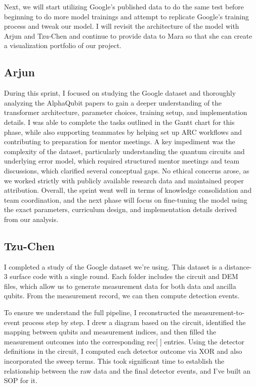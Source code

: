 \documentclass[12pt]{article}
\begin{document}
Next, we will start utilizing Google’s published data to do the same test before beginning to 
do more model trainings and attempt to replicate Google’s training process and tweak our 
model. I will revisit the architecture of the model with Arjun and Tzu-Chen and continue 
to provide data to Mara so that she can create a visualization portfolio of our project.


\subsection*{Arjun}

During this sprint, I focused on studying the Google dataset and thoroughly analyzing the AlphaQubit
 papers to gain a deeper understanding of the transformer architecture, parameter choices, training 
 setup, and implementation details. I was able to complete the tasks outlined in the Gantt chart for 
 this phase, while also supporting teammates by helping set up ARC workflows and contributing to 
 preparation for mentor meetings. A key impediment was the complexity of the dataset, particularly
  understanding the quantum circuits and underlying error model, which required structured mentor 
  meetings and team discussions, which clarified several conceptual gaps. No ethical concerns 
  arose, as we worked strictly with publicly available research data and maintained proper attribution.
   Overall, the sprint went well in terms of knowledge consolidation and team coordination, and
    the next phase will focus on fine-tuning the model using the exact parameters, curriculum design, 
    and implementation details derived from our analysis.

\subsection*{Tzu-Chen}

I completed a study of the Google dataset we’re using. This dataset is a distance-3 surface code 
with a single round. Each folder includes the circuit and DEM files, which allow us to generate 
measurement data for both data and ancilla qubits. From the measurement record, we can then 
compute detection events.

To ensure we understand the full pipeline, I reconstructed the measurement-to-event process
 step by step. I drew a diagram based on the circuit, identified the mapping between qubits and 
 measurement indices, and then filled the measurement outcomes into the corresponding rec[ ] 
 entries. Using the detector definitions in the circuit, I computed each detector outcome via XOR 
 and also incorporated the sweep terms. This took significant time to establish the relationship 
 between the raw data and the final detector events, and I’ve built an SOP for it.
\end{document}
